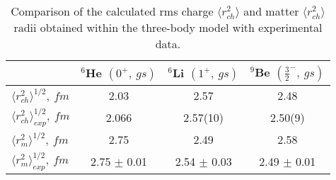 \documentclass[
12pt, %
oneside, %
english, %
onehalfspacing, %
onehalfspacing, %
headsepline, %
]{MastersDoctoralThesis} %
\begin{document}
\begin{table}[bp]
\caption{\footnotesize Comparison of the calculated rms charge $\langle r^{2}_{ch}\rangle$ and matter $\langle r^{2}_{ch}\rangle$ radii obtained within the three-body model with experimental data.}
\label{tab:rms_matter}
\begin{tabular*}{\textwidth}{@{\extracolsep{\fill}}lccc@{}}
\toprule
 & $^6$He                                                                                                                                                  $(0^+,~gs)$ & $^6$Li                                                                                                                                                                                                                                                                                                  $(1^+,~gs)$  & $^9$Be                                                                                                                                                                                                                                                                                                  $(\frac{3}{2}^-,~gs)$  \\
\midrule
$\langle r^{2}_{ch}\rangle^{1/2},~fm$ & 2.03 & 2.57   & 2.48 \\
$\langle r^{2}_{ch}\rangle^{1/2}_{exp},~fm$
& 2.066 \cite{angeli2013table} & 2.57(10) \cite{bumiller1972elastic}   & 2.50(9) \cite{fey1973nuclear} \\
\midrule
$\langle r^{2}_{m}\rangle^{1/2},~fm$& 2.75 & 2.49   & 2.58 \\
$\langle r^{2}_{m}\rangle^{1/2}_{exp},~fm$ 
& 2.75 $\pm$ 0.01 \cite{tanihata1985measurements} 
& 2.54 $\pm$ 0.03  \cite{tanihata1985measurements}
& 2.49 $\pm$ 0.01 \cite{tanihata1985measurements} \\

  \bottomrule
\end{tabular*}
\end{table}
\end{document}
